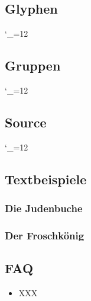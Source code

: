\documentclass{fontdoku}
\begin{document}
\newpage
\subsection{Glyphen}

{%
\setlength{\columnseprule}{.5pt}
\setlength{\columnsep}{1cm}
\begin{multicols}{3}
   \newcommand{\GYLPHNAME}[1]{\sindex[glyph]{#1}%
   \makebox[3cm][l]{\hypertarget{glyph.#1}{}\hyperlink{gglyph.#1}{#1}}\hfill%
   {\Huge\fbox{\Lglyph{#1}\strut}}\hfill\mbox{}\newline}
   \catcode`\_=12%
\end{multicols}
}


\newpage
\subsection{Gruppen}
{\setlength{\columnseprule}{.5pt}
\setlength{\columnsep}{1cm}
\catcode`\_=12%
\newcommand{\GROUPHEAD}[1]{\begin{multicols}{3}[\subsubsection{#1}]}
\newcommand{\GROUPFOOT}{\end{multicols}}
\newcommand{\GROUPGLYPH}[2]{\sindex[glyph]{#2}%
   \makebox[3cm][l]{\hyperlink{glyph.#2}{#2}\hypertarget{gglyph.#2}{}{ \small(0x#1)}}%
   \hfill{\Huge\Lglyph{#2}\strut}\hfill\mbox{}\newline}
}

\newpage
\subsection{Source}



\newpage
{}
%
{\catcode`\_=12%
\def\indexcolumn{4}%
\printindex[glyph]
}
\printindex[idx]

\newpage
\subsection{Textbeispiele}

\subsubsection{Die Judenbuche}
{\color[HTML]{8c0b0b}

}
\newpage
\subsubsection{Der Froschkönig}
{\color[HTML]{8c0b0b}

}

\newpage
\subsection{FAQ}

\begin{itemize}
   \item XXX
\end{itemize}
\end{document}

